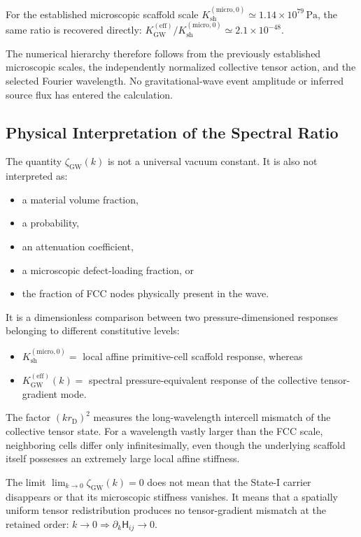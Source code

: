 For the established microscopic scaffold scale $K_{\mathrm{sh}}^{(\mathrm{micro},0)} \simeq 1.14\times10^{79}\,\mathrm{Pa}$, the same ratio is recovered directly: $K_{\mathrm{GW}}^{(\mathrm{eff})} / K_{\mathrm{sh}}^{(\mathrm{micro},0)} \simeq 2.1\times10^{-48}$.

The numerical hierarchy therefore follows from the previously established microscopic scales, the independently normalized collective tensor action, and the selected Fourier wavelength. No gravitational-wave event amplitude or inferred source flux has entered the calculation.

\subsection{Physical Interpretation of the Spectral Ratio}
\label{subsec:n7_zeta_interpretation}

The quantity $\zeta_{\mathrm{GW}}(k)$ is not a universal vacuum constant. It is also not interpreted as:
\begin{itemize}
    \item a material volume fraction,
    \item a probability,
    \item an attenuation coefficient,
    \item a microscopic defect-loading fraction, or
    \item the fraction of FCC nodes physically present in the wave.
\end{itemize}

It is a dimensionless comparison between two pressure-dimensioned responses belonging to different constitutive levels:
\begin{itemize}
    \item $K_{\mathrm{sh}}^{(\mathrm{micro},0)} =$ local affine primitive-cell scaffold response, whereas
    \item $K_{\mathrm{GW}}^{(\mathrm{eff})}(k) =$ spectral pressure-equivalent response of the collective tensor-gradient mode.
\end{itemize}

The factor $(kr_{\mathrm{D}})^{2}$ measures the long-wavelength intercell mismatch of the collective tensor state. For a wavelength vastly larger than the FCC scale, neighboring cells differ only infinitesimally, even though the underlying scaffold itself possesses an extremely large local affine stiffness.

The limit $\lim_{k\to 0} \zeta_{\mathrm{GW}}(k) = 0$ does not mean that the State-I carrier disappears or that its microscopic stiffness vanishes. It means that a spatially uniform tensor redistribution produces no tensor-gradient mismatch at the retained order: $k\to 0 \Longrightarrow \partial_{k}\mathsf{H}_{ij} \to 0$.

